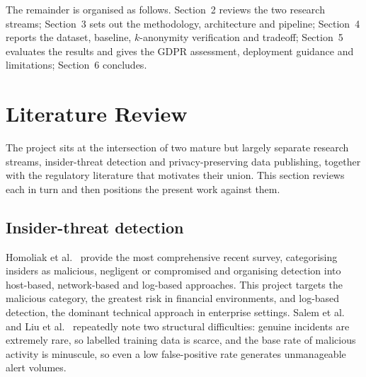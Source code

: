 \documentclass[10pt,a4paper]{article}
\begin{document}
The remainder is organised as follows. Section~2 reviews the two research streams; Section~3 sets out the methodology, architecture and pipeline; Section~4 reports the dataset, baseline, $k$-anonymity verification and tradeoff; Section~5 evaluates the results and gives the GDPR assessment, deployment guidance and limitations; Section~6 concludes.

\section{Literature Review}
\label{sec:litreview}
The project sits at the intersection of two mature but largely separate research streams, insider-threat detection and privacy-preserving data publishing, together with the regulatory literature that motivates their union. This section reviews each in turn and then positions the present work against them.

\subsection{Insider-threat detection}
Homoliak et al.\ \cite{homoliak2019} provide the most comprehensive recent survey, categorising insiders as malicious, negligent or compromised and organising detection into host-based, network-based and log-based approaches. This project targets the malicious category, the greatest risk in financial environments, and log-based detection, the dominant technical approach in enterprise settings. Salem et al.\ \cite{salem2008} and Liu et al.\ \cite{liu2018} repeatedly note two structural difficulties: genuine incidents are extremely rare, so labelled training data is scarce, and the base rate of malicious activity is minuscule, so even a low false-positive rate generates unmanageable alert volumes.
\end{document}

